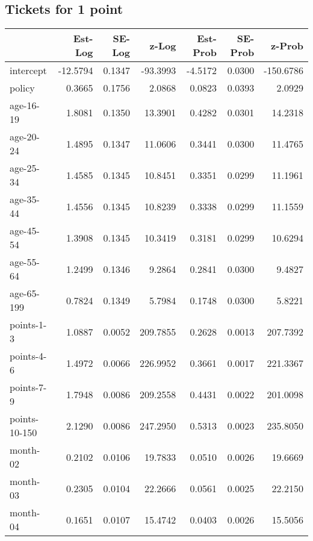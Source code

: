 \documentclass[10pt]{article}
\begin{document}

\subsection{Tickets for 1 point}




\begin{table}[ht]
\centering
\begin{tabular}{lrrrrrr}
  \hline
 & Est-Log & SE-Log & z-Log & Est-Prob & SE-Prob & z-Prob \\ 
  \hline
intercept & -12.5794 & 0.1347 & -93.3993 & -4.5172 & 0.0300 & -150.6786 \\ 
  policy & 0.3665 & 0.1756 & 2.0868 & 0.0823 & 0.0393 & 2.0929 \\ 
  age-16-19 & 1.8081 & 0.1350 & 13.3901 & 0.4282 & 0.0301 & 14.2318 \\ 
  age-20-24 & 1.4895 & 0.1347 & 11.0606 & 0.3441 & 0.0300 & 11.4765 \\ 
  age-25-34 & 1.4585 & 0.1345 & 10.8451 & 0.3351 & 0.0299 & 11.1961 \\ 
  age-35-44 & 1.4556 & 0.1345 & 10.8239 & 0.3338 & 0.0299 & 11.1559 \\ 
  age-45-54 & 1.3908 & 0.1345 & 10.3419 & 0.3181 & 0.0299 & 10.6294 \\ 
  age-55-64 & 1.2499 & 0.1346 & 9.2864 & 0.2841 & 0.0300 & 9.4827 \\ 
  age-65-199 & 0.7824 & 0.1349 & 5.7984 & 0.1748 & 0.0300 & 5.8221 \\ 
  points-1-3 & 1.0887 & 0.0052 & 209.7855 & 0.2628 & 0.0013 & 207.7392 \\ 
  points-4-6 & 1.4972 & 0.0066 & 226.9952 & 0.3661 & 0.0017 & 221.3367 \\ 
  points-7-9 & 1.7948 & 0.0086 & 209.2558 & 0.4431 & 0.0022 & 201.0098 \\ 
  points-10-150 & 2.1290 & 0.0086 & 247.2950 & 0.5313 & 0.0023 & 235.8050 \\ 
  month-02 & 0.2102 & 0.0106 & 19.7833 & 0.0510 & 0.0026 & 19.6669 \\ 
  month-03 & 0.2305 & 0.0104 & 22.2666 & 0.0561 & 0.0025 & 22.2150 \\ 
  month-04 & 0.1651 & 0.0107 & 15.4742 & 0.0403 & 0.0026 & 15.5056 \\ 

\end{tabular}
\end{table}
\end{document}
